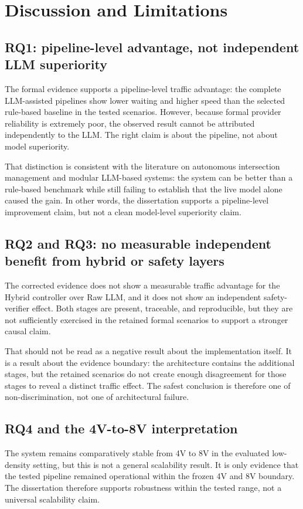 \documentclass[letterpaper,10pt,conference]{ieeeconf}
\begin{document}
\section{Discussion and Limitations}
\subsection{RQ1: pipeline-level advantage, not independent LLM superiority}
The formal evidence supports a pipeline-level traffic advantage: the complete LLM-assisted pipelines show lower waiting and higher speed than the selected rule-based baseline in the tested scenarios. However, because formal provider reliability is extremely poor, the observed result cannot be attributed independently to the LLM. The right claim is about the pipeline, not about model superiority.

That distinction is consistent with the literature on autonomous intersection management and modular LLM-based systems: the system can be better than a rule-based benchmark while still failing to establish that the live model alone caused the gain. In other words, the dissertation supports a pipeline-level improvement claim, but not a clean model-level superiority claim.

\subsection{RQ2 and RQ3: no measurable independent benefit from hybrid or safety layers}
The corrected evidence does not show a measurable traffic advantage for the Hybrid controller over Raw LLM, and it does not show an independent safety-verifier effect. Both stages are present, traceable, and reproducible, but they are not sufficiently exercised in the retained formal scenarios to support a stronger causal claim.

That should not be read as a negative result about the implementation itself. It is a result about the evidence boundary: the architecture contains the additional stages, but the retained scenarios do not create enough disagreement for those stages to reveal a distinct traffic effect. The safest conclusion is therefore one of non-discrimination, not one of architectural failure.

\subsection{RQ4 and the 4V-to-8V interpretation}
The system remains comparatively stable from 4V to 8V in the evaluated low-density setting, but this is not a general scalability result. It is only evidence that the tested pipeline remained operational within the frozen 4V and 8V boundary. The dissertation therefore supports robustness within the tested range, not a universal scalability claim.
\end{document}
